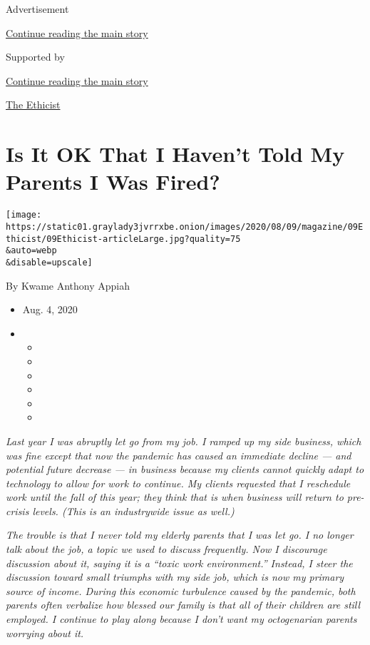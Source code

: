 Advertisement

\protect\hyperlink{after-top}{Continue reading the main story}

Supported by

\protect\hyperlink{after-sponsor}{Continue reading the main story}

\href{/column/the-ethicist}{The Ethicist}

\hypertarget{is-it-ok-that-i-havent-told-my-parents-i-was-fired}{%
\section{Is It OK That I Haven't Told My Parents I Was
Fired?}\label{is-it-ok-that-i-havent-told-my-parents-i-was-fired}}

\texttt{[image: https://static01.graylady3jvrrxbe.onion/images/2020/08/09/magazine/09Ethicist/09Ethicist-articleLarge.jpg?quality=75\\\&auto=webp\\\&disable=upscale]}

By Kwame Anthony Appiah

\begin{itemize}
\item
  Aug. 4, 2020
\item
  \begin{itemize}
  \item
  \item
  \item
  \item
  \item
  \item
  \end{itemize}
\end{itemize}

\emph{Last year I was abruptly let go from my job. I ramped up my side
business, which was fine except that now the pandemic has caused an
immediate decline --- and potential future decrease --- in business
because my clients cannot quickly adapt to technology to allow for work
to continue. My clients requested that I reschedule work until the fall
of this year; they think that is when business will return to pre-crisis
levels. (This is an industrywide issue as well.)}

\emph{The trouble is that I never told my elderly parents that I was let
go. I no longer talk about the job, a topic we used to discuss
frequently. Now I discourage discussion about it, saying it is a ``toxic
work environment.'' Instead, I steer the discussion toward small
triumphs with my side job, which is now my primary source of income.
During this economic turbulence caused by the pandemic, both parents
often verbalize how blessed our family is that all of their children are
still employed. I continue to play along because I don't want my
octogenarian parents worrying about it.}

